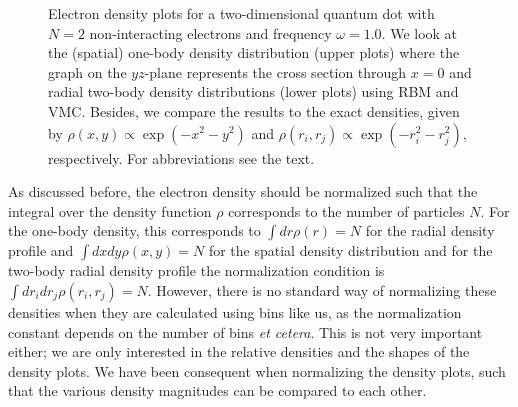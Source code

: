 \begin{figure}
	\centering
	\captionsetup[subfigure]{labelformat=empty}
	\hspace{0.1cm}
	
	\hspace{0.1cm}
	
	\caption{Electron density plots for a two-dimensional quantum dot with $N=2$ non-interacting electrons and frequency $\omega=1.0$. We look at the (spatial) one-body density distribution (upper plots) where the graph on the $yz$-plane represents the cross section through $x=0$ and radial two-body density distributions (lower plots) using RBM and VMC. Besides, we compare the results to the exact densities, given by $\rho(x,y)\propto\exp(-x^2-y^2)$ and $\rho(r_i,r_j)\propto\exp(-r_i^2-r_j^2)$, respectively. For abbreviations see the text.}
	\label{fig:ED_nointeraction}
\end{figure}

As discussed before, the electron density should be normalized such that the integral over the density function $\rho$ corresponds to the number of particles $N$. For the one-body density, this corresponds to $\int dr\rho(r)=N$ for the radial density profile and $\int dxdy\rho(x,y)=N$ for the spatial density distribution and for the two-body radial density profile the normalization condition is $\int dr_idr_j\rho(r_i,r_j)=N$. However, there is no standard way of normalizing these densities when they are calculated using bins like us, as the normalization constant depends on the number of bins \textit{et cetera}. This is not very important either; we are only interested in the relative densities and the shapes of the density plots. We have been consequent when normalizing the density plots, such that the various density magnitudes can be compared to each other.

